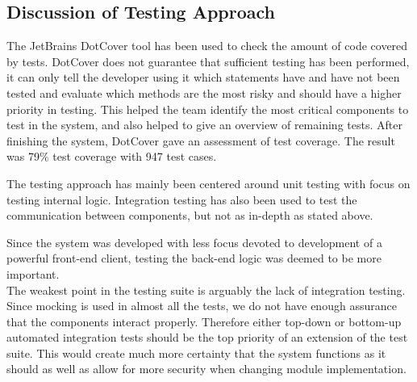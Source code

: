 \subsection{Discussion of Testing Approach}
The JetBrains DotCover tool has been used to check the amount of code covered by tests. DotCover does not guarantee that sufficient testing has been performed, it can only tell the developer using it which statements have and have not been tested and evaluate which methods are the most risky and should have a higher priority in testing. This helped the team identify the most critical components to test in the system, and also helped to give an overview of remaining tests. After finishing the system, DotCover gave an assessment of test coverage. The result was 79\% test coverage with 947 test cases. 

The testing approach has mainly been centered around unit testing with focus on testing internal logic.
Integration testing has also been used to test the communication between components, but not as in-depth as stated above. 

Since the system was developed with less focus devoted to development of a powerful front-end client, testing the back-end logic was deemed to be more important. \\

The weakest point in the testing suite is arguably the lack of integration testing. Since mocking is used in almost all the tests, we do not have enough assurance that the components interact properly. Therefore either top-down or bottom-up automated integration tests should be the top priority of an extension of the test suite. This would create much more certainty that the system functions as it should as well as allow for more security when changing module implementation.